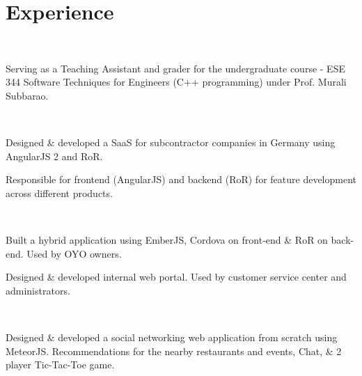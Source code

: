 \documentclass[]{deedy-resume-openfont}
\begin{document}

\section{Experience}
\hfill
{}\\
\begin{tightemize}
\item Serving as a Teaching Assistant and grader for the undergraduate course - ESE 344 Software Techniques for Engineers (C++ programming) under Prof. Murali Subbarao.
\end{tightemize}
\sectionsep

\hfill
{}\\
\begin{tightemize}
\item {} Designed \& developed a SaaS for subcontractor companies in Germany using AngularJS 2 and RoR.
\item Responsible for frontend (AngularJS) and backend (RoR) for feature development across different products.
\end{tightemize}
\sectionsep

\hfill
{}\\
\begin{tightemize}
\item {} Built a hybrid application using EmberJS, Cordova on front-end \& RoR on back-end. Used by OYO owners.
\item {} Designed \& developed internal web portal. Used by customer service center and administrators.
\end{tightemize}
\sectionsep

\hfill
{}\\
\begin{tightemize}
\item Designed \& developed a social networking web application from scratch using MeteorJS. Recommendations for the nearby restaurants and events, Chat, \& 2 player Tic-Tac-Toe game.
\end{tightemize}
\sectionsep
\end{document}
